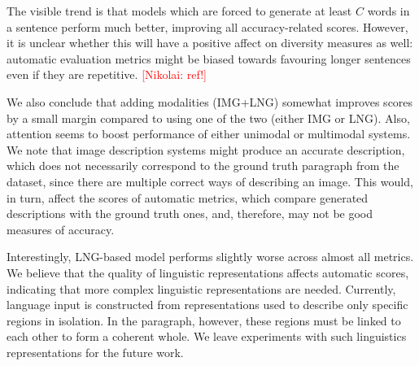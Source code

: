 \documentclass[11pt,a4paper]{article}
\newcommand{\kibitz}[2]{\ifnum\Comments=1\textcolor{#1}{#2}\fi}
\newcommand{\nikolai}[1]{\kibitz{red}      {[Nikolai: #1]}}
\begin{document}
The visible trend is that models which are forced to generate at least $C$ words in a sentence perform much better, improving all accuracy-related scores.
However, it is unclear whether this will have a positive affect on diversity measures as well: automatic evaluation metrics might be biased towards favouring longer sentences even if they are repetitive.
\nikolai{ref!}

We also conclude that adding modalities (IMG+LNG) somewhat improves scores by a small margin compared to using one of the two (either IMG or LNG).
Also, attention seems to boost performance of either unimodal or multimodal systems.
We note that image description systems might produce an accurate description, which does not necessarily correspond to the ground truth paragraph from the dataset, since there are multiple correct ways of describing an image.
This would, in turn, affect the scores of automatic metrics, which compare generated descriptions with the ground truth ones, and, therefore, may not be good measures of accuracy.

Interestingly, LNG-based model performs slightly worse across almost all metrics.
We believe that the quality of linguistic representations affects automatic scores, indicating that more complex linguistic representations are needed.
Currently, language input is constructed from representations used to describe only specific regions in isolation.
In the paragraph, however, these regions must be linked to each other to form a coherent whole.
We leave experiments with such linguistics representations for the future work.

\end{document}
